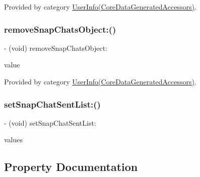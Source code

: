 Provided by category \hyperlink{category_user_info_07_core_data_generated_accessors_08_a7b335565ece5b09bb633af92eeaf47eb}{User\+Info(\+Core\+Data\+Generated\+Accessors)}.

\hypertarget{interface_user_info_a8ac63ce90e9911d188c01c95ec18b638}{}\label{interface_user_info_a8ac63ce90e9911d188c01c95ec18b638} 
\subsubsection{\texorpdfstring{remove\+Snap\+Chats\+Object\+:()}{removeSnapChatsObject:()}}
{\footnotesize\ttfamily -\/ (void) remove\+Snap\+Chats\+Object\+: \begin{DoxyParamCaption}\item[{(\hyperlink{interface_snap}{Snap} $\ast$)}]{value }\end{DoxyParamCaption}}



Provided by category \hyperlink{category_user_info_07_core_data_generated_accessors_08_a8ac63ce90e9911d188c01c95ec18b638}{User\+Info(\+Core\+Data\+Generated\+Accessors)}.

\hypertarget{interface_user_info_a9990c43706b23a8a14601d05a2f6cd79}{}\label{interface_user_info_a9990c43706b23a8a14601d05a2f6cd79} 
\subsubsection{\texorpdfstring{set\+Snap\+Chat\+Sent\+List\+:()}{setSnapChatSentList:()}}
{\footnotesize\ttfamily -\/ (void) set\+Snap\+Chat\+Sent\+List\+: \begin{DoxyParamCaption}\item[{(N\+S\+Set$<$\hyperlink{interface_snap}{Snap} $\ast$$>$ $\ast$)}]{values }\end{DoxyParamCaption}}



\subsection{Property Documentation}
\hypertarget{interface_user_info_a725f8b96488308d73380d050eed90b95}{}\label{interface_user_info_a725f8b96488308d73380d050eed90b95} 
